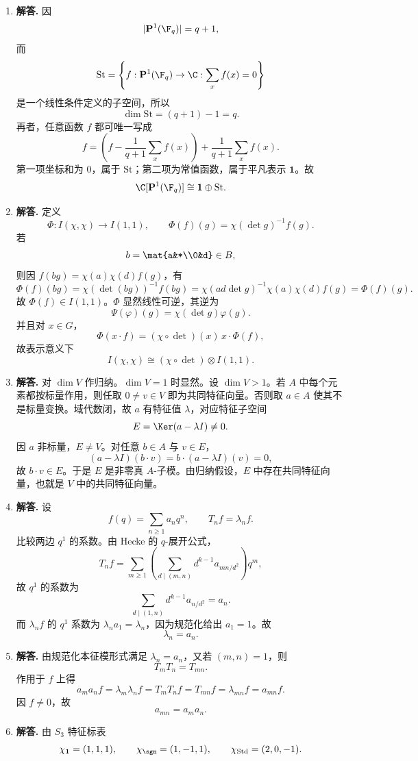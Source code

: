 \begin{enumerate}[label=\textbf{\arabic*.}, leftmargin=*, itemsep=1em]
\item \textbf{解答.} 因
\[
|\mathbf P^1(\F_q)|=q+1,
\]
而
\[
\mathrm{St}=\left\{f:\mathbf P^1(\F_q)\to\C:\sum_x f(x)=0\right\}
\]
是一个线性条件定义的子空间，所以
\[
\dim \mathrm{St}=(q+1)-1=q.
\]
再者，任意函数 $f$ 都可唯一写成
\[
f=\left(f-\frac1{q+1}\sum_xf(x)\right)+\frac1{q+1}\sum_xf(x).
\]
第一项坐标和为 $0$，属于 $\mathrm{St}$；第二项为常值函数，属于平凡表示 $\mathbf1$。故
\[
\C[\mathbf P^1(\F_q)]\cong \mathbf1\oplus \mathrm{St}.
\]

\item \textbf{解答.} 定义
\[
\Phi:I(\chi,\chi)\to I(1,1),\qquad \Phi(f)(g)=\chi(\det g)^{-1}f(g).
\]
若
\[
b=\mat{a&*\\0&d}\in B,
\]
则因 $f(bg)=\chi(a)\chi(d)f(g)$，有
\[
\Phi(f)(bg)=\chi(\det(bg))^{-1}f(bg)
=\chi(ad\det g)^{-1}\chi(a)\chi(d)f(g)=\Phi(f)(g).
\]
故 $\Phi(f)\in I(1,1)$。$\Phi$ 显然线性可逆，其逆为
\[
\Psi(\varphi)(g)=\chi(\det g)\varphi(g).
\]
并且对 $x\in G$，
\[
\Phi(x\cdot f)= (\chi\circ\det)(x)\, x\cdot \Phi(f),
\]
故表示意义下
\[
I(\chi,\chi)\cong (\chi\circ\det)\otimes I(1,1).
\]

\item \textbf{解答.} 对 $\dim V$ 作归纳。$\dim V=1$ 时显然。设 $\dim V>1$。若 $A$ 中每个元素都按标量作用，则任取 $0\neq v\in V$ 即为共同特征向量。否则取 $a\in A$ 使其不是标量变换。域代数闭，故 $a$ 有特征值 $\lambda$，对应特征子空间
\[
E=\Ker(a-\lambda I)\neq0.
\]
因 $a$ 非标量，$E\neq V$。对任意 $b\in A$ 与 $v\in E$，
\[
(a-\lambda I)(b\cdot v)=b\cdot(a-\lambda I)(v)=0,
\]
故 $b\cdot v\in E$。于是 $E$ 是非零真 $A$-子模。由归纳假设，$E$ 中存在共同特征向量，也就是 $V$ 中的共同特征向量。

\item \textbf{解答.} 设
\[
f(q)=\sum_{n\ge1}a_nq^n,\qquad T_nf=\lambda_nf.
\]
比较两边 $q^1$ 的系数。由 Hecke 的 $q$-展开公式，
\[
T_nf=\sum_{m\ge1}\left(\sum_{d\mid(m,n)}d^{k-1}a_{mn/d^2}\right)q^m,
\]
故 $q^1$ 的系数为
\[
\sum_{d\mid(1,n)}d^{k-1}a_{n/d^2}=a_n.
\]
而 $\lambda_nf$ 的 $q^1$ 系数为 $\lambda_n a_1=\lambda_n$，因为规范化给出 $a_1=1$。故
\[
\lambda_n=a_n.
\]

\item \textbf{解答.} 由规范化本征模形式满足 $\lambda_n=a_n$，又若 $(m,n)=1$，则
\[
T_mT_n=T_{mn}.
\]
作用于 $f$ 上得
\[
a_ma_n f=\lambda_m\lambda_n f=T_mT_nf=T_{mn}f=\lambda_{mn}f=a_{mn}f.
\]
因 $f\neq0$，故
\[
a_{mn}=a_ma_n.
\]

\item \textbf{解答.} 由 $S_3$ 特征标表
\[
\chi_{\mathbf1}=(1,1,1),\qquad
\chi_{\sgn}=(1,-1,1),\qquad
\chi_{\mathrm{Std}}=(2,0,-1).
\]


\end{enumerate}

